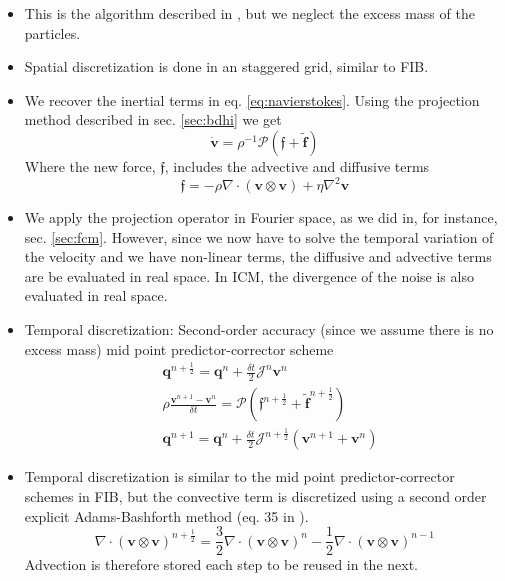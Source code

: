 \documentclass[ twoside,openright,titlepage,numbers=noenddot,%
headinclude,footinclude,cleardoublepage=empty,abstract=on,
BCOR=5mm,paper=a4,fontsize=11pt, dvipsnames
]{scrreprt}
\renewcommand{\vec}[1]{\bm{#1}}
\newcommand{\oper}[1]{\mathcal{#1}}
\newcommand{\dt}{\delta t}
\newcommand{\half}{\frac{1}{2}}
\newcommand{\ppos}{q}
\newcommand{\fvel}{v}
\begin{document}
\begin{itemize}
\item This is the algorithm described in \cite{Balboa2014}, but we neglect the excess mass of the particles.
\item Spatial discretization is done in an staggered grid, similar to FIB.
\item We recover the inertial terms in eq. \eqref{eq:navierstokes}. Using the projection method described in sec. \ref{sec:bdhi} we get
  \begin{equation}
    \dot{\vec{\fvel}} = \rho^{-1} \oper{P}\left(\vec{\mathfrak{f}} + \tilde{\vec{f}}\right)
  \end{equation}
  Where the new force, $\vec{\mathfrak{f}}$, includes the advective and diffusive terms
  \begin{equation}
    \vec{\mathfrak{f}} = -\rho\nabla\cdot (\vec{\fvel}\otimes\vec{\fvel}) + \eta\nabla^2\vec{\fvel}
  \end{equation}

\item We apply the projection operator in Fourier space, as we did in, for instance, sec. \ref{sec:fcm}. However, since we now have to solve the temporal variation of the velocity and we have non-linear terms, the diffusive and advective terms are be evaluated in real space. In ICM, the divergence of the noise is also evaluated in real space.
\item Temporal discretization: Second-order accuracy (since we assume there is no excess mass) mid point predictor-corrector scheme
  \begin{equation}
    \label{eq:icmalgo}
    \begin{aligned}
      &\vec{\ppos}^{n+\half} = \vec{\ppos}^n + \frac{\dt}{2}\oper{J}^n\vec{\fvel}^n\\
      &\rho\frac{\vec{\fvel}^{n+1} - \vec{\fvel}^n}{\dt} = \oper{P}\left(\vec{\mathfrak{f}}^{n+\half} + \tilde{\vec{f}}^{n+\half} \right)\\
      &\vec{\ppos}^{n+1} = \vec{\ppos}^n + \frac{\dt}{2}\oper{J}^{n+\half}\left(\vec{\fvel}^{n+1} + \vec{\fvel}^{n}\right)
  \end{aligned}
\end{equation}

\item Temporal discretization is similar to the mid point predictor-corrector schemes in FIB, but the convective term is discretized using a second order explicit Adams-Bashforth method (eq. 35 in \cite{Balboa2014}).
  \begin{equation}
    \nabla\cdot (\vec{\fvel}\otimes\vec{\fvel})^{n+\half} = \frac{3}{2} \nabla\cdot (\vec{\fvel}\otimes\vec{\fvel})^n - \half \nabla\cdot (\vec{\fvel}\otimes\vec{\fvel})^{n-1}
  \end{equation}
  Advection is therefore stored each step to be reused in the next.
  

\end{itemize}
\end{document}
